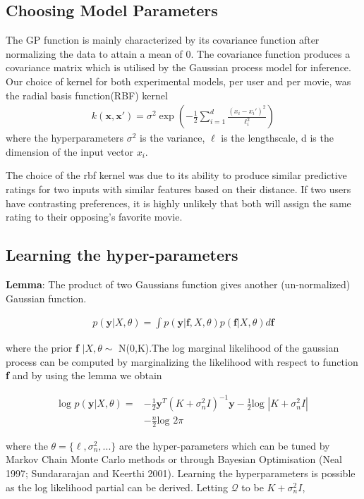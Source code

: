 \documentclass[letterpaper]{article}
\begin{document}
\subsection{Choosing Model Parameters}
The GP function is mainly characterized by its covariance function after normalizing the data to attain a mean of 0. The covariance function produces a covariance matrix which is utilised by the Gaussian process model for inference.
Our choice of kernel for both experimental models, per user and per movie, was the radial basis function(RBF) kernel
\begin{align*}
	k (\textbf{x},\textbf{x}') = \sigma^2\exp(-\frac{1}{2}\sum_{i=1}^{d}
	\frac{(x_{i} - x_{i}')^{2}}{\ell_{i}^{2}})
\end{align*} 
where the hyperparameters $\sigma^{2}$ is the variance, $\ell $ is the lengthscale, d is the dimension of the input vector $ x_{i}. $

The choice of the rbf kernel was due to its ability to produce similar predictive ratings for two inputs with similar features based on their distance. If two users have contrasting preferences, it is highly unlikely that both will assign the same rating to their opposing's favorite movie.

\subsection{Learning the hyper-parameters}
\textbf{Lemma}: The product of two Gaussians function gives another (un-normalized) Gaussian function.

\begin{align*}
p(\mathbf{y}|X,\theta) = \int p(\mathbf{y}|\mathbf{f},X,\theta)
p(\mathbf{f}|X,\theta) d\mathbf{f}
\end{align*}

where the prior \textbf{f} $|X,\theta \sim$ N(0,K).The log marginal likelihood of the gaussian process can be computed by marginalizing the likelihood with respect to function \textbf{f} and by using the lemma we obtain 

\begin{align*}
\text{log }p(\mathbf{y}|X,\theta) = 
&-\frac{1}{2}\mathbf{y}^{T}(K+\sigma^{2}_{n}I)^{-1}\mathbf{y}
-\frac{1}{2}\text{log } |K+\sigma^{2}_{n}I| \\
&-\frac{n}{2}\text{log }2\pi
\end{align*}

where the $\theta = \{\ell,\sigma^{2}_{n},...\}$ are the hyper-parameters which can be tuned by Markov Chain Monte Carlo methods or through Bayesian Optimisation (Neal 1997; Sundararajan and Keerthi 2001). Learning the hyperparameters is possible as the log likelihood partial can be derived. Letting $\mathcal{Q}$ to be 
$K + \sigma^{2}_{n}I$, 
\end{document}
